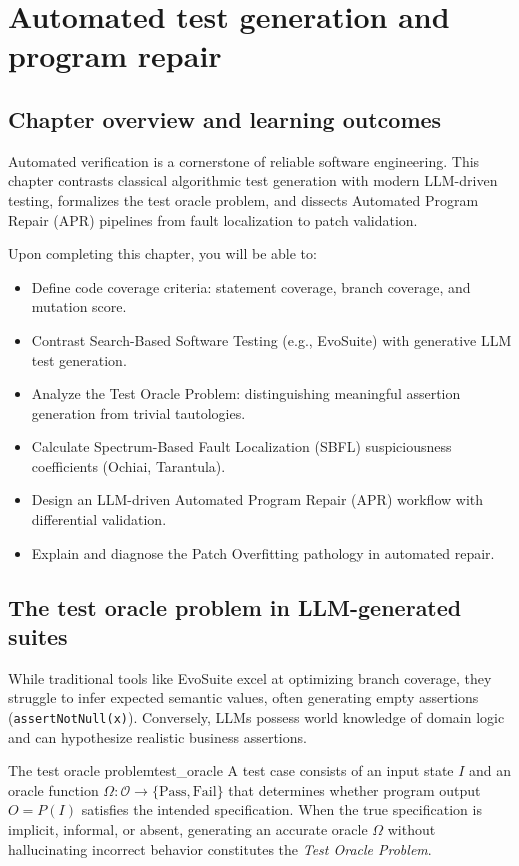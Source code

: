 \documentclass[../../main.tex]{subfiles}
\begin{document}
\chapter{Automated test generation and program repair}
\label{ch:automated_test_generation_repair}

\section{Chapter overview and learning outcomes}
Automated verification is a cornerstone of reliable software engineering. This chapter contrasts classical algorithmic test generation with modern LLM-driven testing, formalizes the test oracle problem, and dissects Automated Program Repair (APR) pipelines from fault localization to patch validation.

Upon completing this chapter, you will be able to:
\begin{itemize}
    \item Define code coverage criteria: statement coverage, branch coverage, and mutation score.
    \item Contrast Search-Based Software Testing (e.g., EvoSuite) with generative LLM test generation.
    \item Analyze the Test Oracle Problem: distinguishing meaningful assertion generation from trivial tautologies.
    \item Calculate Spectrum-Based Fault Localization (SBFL) suspiciousness coefficients (Ochiai, Tarantula).
    \item Design an LLM-driven Automated Program Repair (APR) workflow with differential validation.
    \item Explain and diagnose the Patch Overfitting pathology in automated repair.
\end{itemize}

\section{The test oracle problem in LLM-generated suites}
While traditional tools like EvoSuite excel at optimizing branch coverage, they struggle to infer expected semantic values, often generating empty assertions (\texttt{assertNotNull(x)}). Conversely, LLMs possess world knowledge of domain logic and can hypothesize realistic business assertions.

\begin{definition}{The test oracle problem}{test_oracle}
A test case consists of an input state $I$ and an oracle function $\Omega: \mathcal{O} \to \{\text{Pass}, \text{Fail}\}$ that determines whether program output $O = P(I)$ satisfies the intended specification. When the true specification is implicit, informal, or absent, generating an accurate oracle $\Omega$ without hallucinating incorrect behavior constitutes the \emph{Test Oracle Problem}.
\end{definition}
\end{document}
